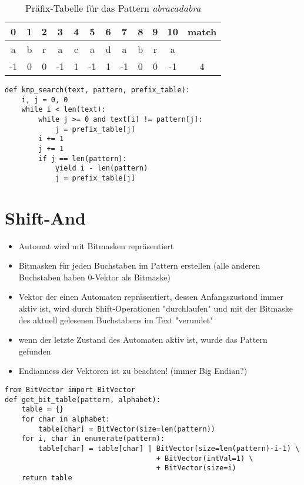 \documentclass[11pt]{article}
\begin{document}
\begin{table}[H]
\begin{center}
	\begin{tabular}{|c|c|c|c|c|c|c|c|c|c|c|c|}
	    \hline
	    0 & 1 & 2 & 3 & 4 & 5 & 6 & 7 & 8 & 9 & 10 & match\\
	    \hline
	    a & b & r & a & c & a & d & a & b & r & a & \\
	    \hline
	    -1 & 0 & 0 & -1 & 1 & -1 & 1 & -1 & 0 & 0 & -1 & 4 \\
	    \hline
    \end{tabular}
\end{center}
\caption{Präfix-Tabelle für das Pattern \emph{abracadabra}}
\end{table}

\begin{lstlisting}
def kmp_search(text, pattern, prefix_table):
    i, j = 0, 0
    while i < len(text):
        while j >= 0 and text[i] != pattern[j]:
            j = prefix_table[j]
        i += 1
        j += 1
        if j == len(pattern):
            yield i - len(pattern)
            j = prefix_table[j]
\end{lstlisting}

\section{Shift-And}

\begin{itemize}
    \item Automat wird mit Bitmasken repräsentiert
	\item Bitmasken für jeden Buchstaben im Pattern erstellen (alle anderen Buchstaben haben 0-Vektor als Bitmaske)
	\item Vektor der einen Automaten repräsentiert, dessen Anfangszustand immer aktiv ist, wird durch Shift-Operationen "durchlaufen" und mit der Bitmaske des aktuell gelesenen Buchstabens im Text "verundet"
	\item wenn der letzte Zustand des Automaten aktiv ist, wurde das Pattern gefunden
	\item Endianness der Vektoren ist zu beachten! (immer Big Endian?)
\end{itemize}

\clearpage

\begin{lstlisting}
from BitVector import BitVector
def get_bit_table(pattern, alphabet):
    table = {}
    for char in alphabet:
        table[char] = BitVector(size=len(pattern))
    for i, char in enumerate(pattern):
        table[char] = table[char] | BitVector(size=len(pattern)-i-1) \
                                    + BitVector(intVal=1) \
                                    + BitVector(size=i)
    return table
\end{lstlisting}
\end{document}
